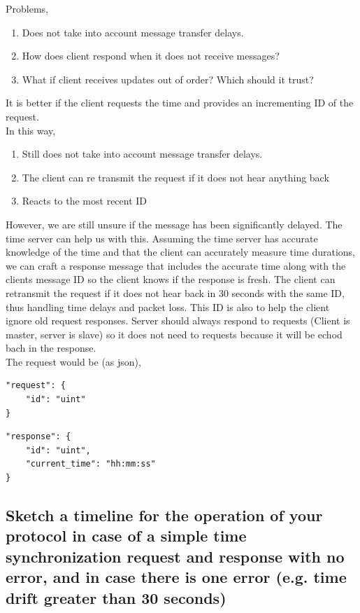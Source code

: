 \documentclass{article}
\begin{document}
		Problems,
		\begin{enumerate}
			\item Does not take into account message transfer delays.
			\item How does client respond when it does not receive messages?
			\item What if client receives updates out of order? Which should it trust?
		\end{enumerate}

		It is better if the client requests the time and provides an incrementing ID of the request.\\
		In this way,
		\begin{enumerate}
			\item Still does not take into account message transfer delays.
			\item The client can re transmit the request if it does not hear anything back
			\item Reacts to the most recent ID
		\end{enumerate}

		However, we are still unsure if the message has been significantly delayed. The time server can help us with this.
		Assuming the time server has accurate knowledge of the time and that the client can accurately measure time durations, we can craft a response message that includes the accurate time along with the clients message ID so
		the client knows if the response is fresh. The client can retransmit the request if it does not hear back in 30 seconds with the same ID, thus handling time delays and packet loss. This ID is also to help the client ignore old request responses. Server should always respond to requests (Client is master, server is slave) so it does not need to 
		requests because it will be echod bach in the response.\\
		The request would be (as json),
		\begin{verbatim}
"request": {
	"id": "uint"
}
		\end{verbatim}

		\begin{verbatim}
"response": {
	"id": "uint",
	"current_time": "hh:mm:ss"
}
		\end{verbatim}

\subsection{Sketch a timeline for the operation of your protocol in case of a simple time
synchronization request and response with no error, and in case there is one error (e.g.
time drift greater than 30 seconds)}
\end{document}
